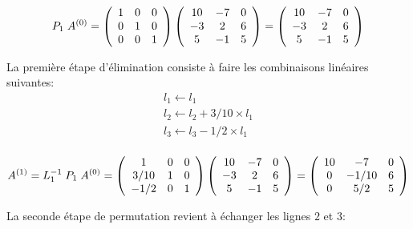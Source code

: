 \documentclass[a4paper, 10pt]{article}
\begin{document}
\begin{equation}
 P_1\; A^{(0)}=
 \left(
\begin{array}{c c c}
1  & 0   &  0  \\
0  &  1   & 0  \\
0  &  0  &  1  
\end{array}
\right)
 \left(
\begin{array}{c c c}
10  & -7   &  0  \\
-3  &  2   & 6   \\
 5  &  -1  &  5  
\end{array}
\right)
=
 \left(
\begin{array}{c c c}
10  & -7   &  0  \\
-3  &  2   & 6   \\
 5  &  -1  &  5  
\end{array}
\right)
\end{equation}

La première étape d'élimination consiste à faire les combinaisons linéaires suivantes: 
 \begin{equation}
 \begin{array}{c}
 l_1 \leftarrow l_1 \\
   l_2 \leftarrow l_2 +3/10 \times l_1   \\ l_3 \leftarrow l_3 -1/2 \times l_1  \\ 
\end{array}
\end{equation}

\begin{equation}
 A^{(1)}=L^{-1}_1 \;  P_1 \; A^{(0)}=
  \left(
\begin{array}{c c c}
1  & 0   &  0  \\
3/10  &  1   & 0  \\
-1/2  &  0  &  1  
\end{array}
\right)
 \left(
\begin{array}{c c c}
10  & -7   &  0  \\
-3  &  2   & 6   \\
 5  &  -1  &  5  
\end{array}
\right)
=
 \left(
\begin{array}{c c c}
10  & -7   &  0  \\
0  &  -1/10   & 6   \\
0  &  5/2  &  5  
\end{array}
\right)
\end{equation}

La seconde étape de permutation revient à échanger les lignes $2$ et $3$:
\end{document}
